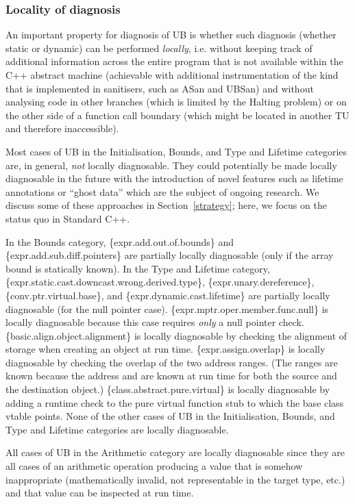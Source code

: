 \subsubsection{Locality of diagnosis}
\label{locally}

An important property for diagnosis of UB is whether such diagnosis (whether static or dynamic) can be performed \emph{locally}, i.e. without keeping track of additional information across the entire program that is not available within the C++ abstract machine (achievable with additional instrumentation of the kind that is implemented in sanitisers, such as ASan and UBSan) and without analysing code in other branches (which is limited by the Halting problem) or on the other side of a function call boundary (which might be located in another TU and therefore inaccessible).

Most cases of UB in the Initialisation, Bounds, and Type and Lifetime categories are, in general, \emph{not} locally diagnosable. They could potentially be made locally diagnosable in the future with the introduction of novel features such as lifetime annotations \cite{P2771R1} or ``ghost data'' \cite{Lippincott2025} which are the subject of ongoing research. We discuss some of these approaches in Section~\ref{strategy}; here, we focus on the status quo in  Standard C++.

In the Bounds category, 
\{expr.add.out.of.bounds\} 
and \{expr.add.sub.diff.pointers\} 
are partially locally diagnosable (only if the array bound is statically known). In the Type and Lifetime category,
\{expr.static.cast.downcast.wrong.derived.type\},
\{expr.unary.dereference\}, 
\{conv.ptr.virtual.base\}, and
\{expr.dynamic.cast.lifetime\}
are partially locally diagnosable (for the null pointer case).
\{expr.mptr.oper.member.func.null\} is locally diagnosable because this case requires \emph{only} a null pointer check.
\{basic.align.object.alignment\} is locally diagnosable by checking the alignment of storage when creating an object at run time.
\{expr.assign.overlap\} is locally diagnosable by checking the overlap of the two address ranges. (The ranges are known because the address and  are known at run time for both the source and the destination object.) \{class.abstract.pure.virtual\} is locally diagnosable by adding a runtime check to  the pure virtual function stub to which the base class vtable points. None of the other cases of UB in the Initialisation, Bounds, and Type and Lifetime categories are locally diagnosable.

All cases of UB in the Arithmetic category are locally diagnosable since they are all cases of an arithmetic operation producing a value that is somehow inappropriate (mathematically invalid, not representable in the target type, etc.) and that value can be inspected at run time.

